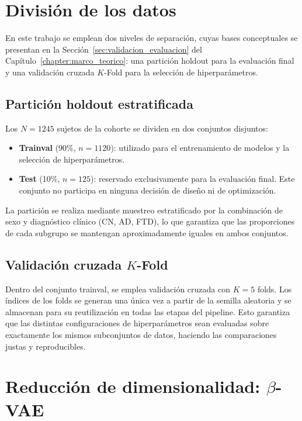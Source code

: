 \section{División de los datos}
\label{sec:division_datos}

En este trabajo se emplean dos niveles de separación, cuyas bases conceptuales se presentan en la Sección~\ref{sec:validacion_evaluacion} del Capítulo~\ref{chapter:marco_teorico}: una partición holdout para la evaluación final y una validación cruzada $K$-Fold para la selección de hiperparámetros.

\subsection{Partición holdout estratificada}

Los $N = 1245$ sujetos de la cohorte se dividen en dos conjuntos disjuntos:
\begin{itemize}
    \item \textbf{Trainval} (90\%, $n = 1120$): utilizado para el entrenamiento de modelos y la selección de hiperparámetros.
    \item \textbf{Test} (10\%, $n = 125$): reservado exclusivamente para la evaluación final. Este conjunto no participa en ninguna decisión de diseño ni de optimización.
\end{itemize}

La partición se realiza mediante muestreo estratificado por la combinación de sexo y diagnóstico clínico (CN, AD, FTD), lo que garantiza que las proporciones de cada subgrupo se mantengan aproximadamente iguales en ambos conjuntos.

\subsection{Validación cruzada $K$-Fold}
\label{sec:kfold}

Dentro del conjunto trainval, se emplea validación cruzada con $K = 5$ folds. Los índices de los folds se generan una única vez a partir de la semilla aleatoria y se almacenan para su reutilización en todas las etapas del pipeline. Esto garantiza que las distintas configuraciones de hiperparámetros sean evaluadas sobre exactamente los mismos subconjuntos de datos, haciendo las comparaciones justas y reproducibles.


\section{Reducción de dimensionalidad: $\beta$-VAE}
\label{sec:beta_vae}

